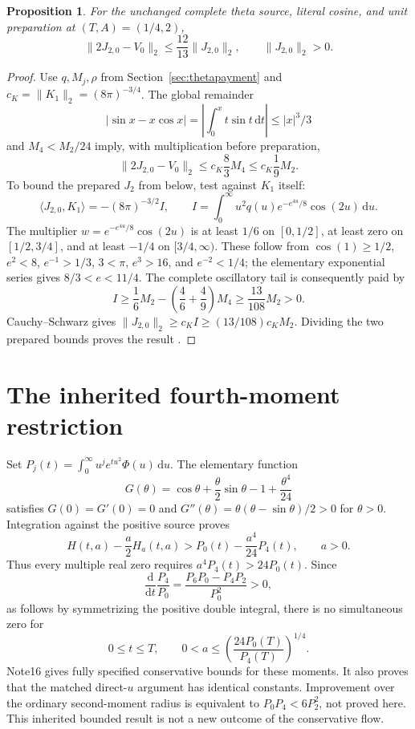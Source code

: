\documentclass[11pt]{article}
\numberwithin{equation}{section}
\newtheorem{proposition}[theorem]{Proposition}
\newcommand{\dd}{\,\mathrm d}
\begin{document}
\begin{proposition}\label{prop:cosinecorrelation}
For the unchanged complete theta source, literal cosine, and unit
preparation at $(T,A)=(1/4,2)$,
\[
 \|2J_{2,0}-V_0\|_2\le\frac{12}{13}\|J_{2,0}\|_2,\qquad
 \|J_{2,0}\|_2>0.
\]
\end{proposition}
\begin{proof}
Use $q,M_j,\rho$ from Section~\ref{sec:thetapayment} and
$c_K=\|K_1\|_2=(8\pi)^{-3/4}$. The global remainder
\[
 |\sin x-x\cos x|
 =\left|\int_0^xt\sin t\dd t\right|\le|x|^3/3
\]
and $M_4<M_2/24$ imply, with multiplication before preparation,
\[
 \|2J_{2,0}-V_0\|_2
 \le c_K\frac83M_4\le c_K\frac19M_2.
\]
To bound the prepared $J_2$ from below, test against $K_1$ itself:
\[
 \langle J_{2,0},K_1\rangle=-(8\pi)^{-3/2}I,\qquad
 I=\int_0^\infty u^2q(u)e^{-e^{4u}/8}\cos(2u)\dd u.
\]
The multiplier $w=e^{-e^{4u}/8}\cos(2u)$ is at least $1/6$ on
$[0,1/2]$, at least zero on $[1/2,3/4]$, and at least $-1/4$ on
$[3/4,\infty)$. These follow from
$\cos(1)\ge1/2$, $e^2<8$, $e^{-1}>1/3$, $3<\pi$,
$e^3>16$, and $e^{-2}<1/4$; the elementary exponential series gives
$8/3<e<11/4$.
The complete oscillatory tail is consequently paid by
\[
 I\ge\frac16M_2-\left(\frac46+\frac49\right)M_4
      \ge\frac{13}{108}M_2>0.
\]
Cauchy--Schwarz gives
$\|J_{2,0}\|_2\ge c_K I\ge(13/108)c_KM_2$.
Dividing the two prepared bounds proves the result
\cite{CosineCorrelationNote}.
\end{proof}


\section{The inherited fourth-moment restriction}\label{sec:fourthmoment}

Set
$P_j(t)=\int_0^\infty u^je^{tu^2}\Phi(u)\dd u$. The elementary
function
\[
G(\theta)=\cos\theta+\frac\theta2\sin\theta-1+\frac{\theta^4}{24}
\]
satisfies $G(0)=G'(0)=0$ and
$G''(\theta)=\theta(\theta-\sin\theta)/2>0$ for $\theta>0$.
Integration against the positive source proves
\begin{equation}\label{eq:moment}
H(t,a)-\frac a2H_a(t,a)>P_0(t)-\frac{a^4}{24}P_4(t),\qquad a>0.
\end{equation}
Thus every multiple real zero requires $a^4P_4(t)>24P_0(t)$.
Since
\[
\frac{\mathrm d}{\mathrm dt}\frac{P_4}{P_0}
=\frac{P_6P_0-P_4P_2}{P_0^2}>0,
\]
as follows by symmetrizing the positive double integral,
there is no simultaneous zero for
\[
0\le t\le T,\qquad
0<a\le\left(\frac{24P_0(T)}{P_4(T)}\right)^{1/4}.
\]
Note16 \cite{FluxNote} gives fully specified conservative bounds for
these moments. It also proves that the matched direct-$u$ argument has
identical constants. Improvement over the ordinary second-moment
radius is equivalent to $P_0P_4<6P_2^2$, not proved here. This
inherited bounded result is not a new outcome of the conservative flow.
\end{document}
